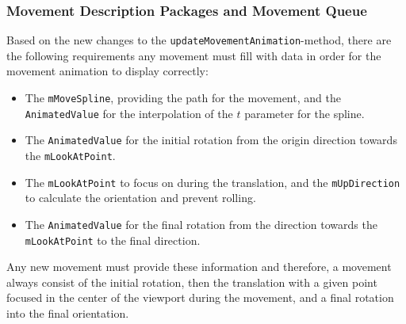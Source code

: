 \subsubsection{Movement Description Packages and Movement Queue}\label{subsubsec:movement-description-packages-and-movement-queue}

Based on the new changes to the \texttt{updateMovementAnimation}-method, there are the following requirements any
movement must fill with data in order for the movement animation to display correctly:
\begin{itemize}
    \item The \texttt{mMoveSpline}, providing the path for the movement, and the \texttt{AnimatedValue}
    for the interpolation of the $t$ parameter for the spline.
    \item The \texttt{AnimatedValue} for the initial rotation from the origin direction towards the
    \texttt{mLookAtPoint}.
    \item The \texttt{mLookAtPoint} to focus on during the translation, and the \texttt{mUpDirection}
    to calculate the orientation and prevent rolling.
    \item The \texttt{AnimatedValue} for the final rotation from the direction towards the
    \texttt{mLookAtPoint} to the final direction.
\end{itemize}
Any new movement must provide these information and therefore, a movement always consist of the initial rotation,
then the translation with a given point focused in the center of the viewport during the movement, and a final
rotation into the final orientation.

